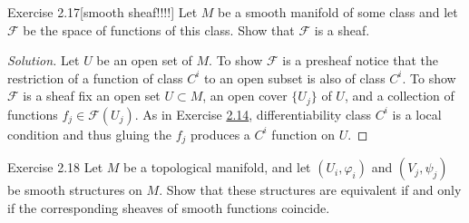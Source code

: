 \begin{thing4}{Exercise 2.17}[smooth sheaf!!!!]\label{exer:2.17}\leavevmode
Let $M$ be a smooth manifold of some class and let $\mathcal{F}$ be the space of functions of this class. Show that $\mathcal{F}$ is a sheaf.
\end{thing4}

\begin{proof}[Solution]\leavevmode
Let $U$ be an open set of $M$. To show $\mathcal{F}$ is a presheaf notice that the restriction of a function of class $C^i$ to an open subset is also of class $C^i$. To show $\mathcal{F}$ is a sheaf fix an open set $U \subset M$, an open cover $\{U_j\}$ of $U$, and a collection of functions $f_j \in \mathcal{F}(U_j)$. As in Exercise \hyperref[exer:2.14]{2.14}, differentiability class $C^i$ is a local condition and thus gluing the $f_j$ produces a $C^i$ function on $U$.
\end{proof}

\begin{thing4}{Exercise 2.18}\label{exer:2.18}\leavevmode
Let $M$ be a topological manifold, and let $(U_i,\varphi_i)$ and $(V_j,\psi_j)$ be smooth structures on $M$. Show that these structures are equivalent if and only if the corresponding sheaves of smooth functions coincide.
\end{thing4}

